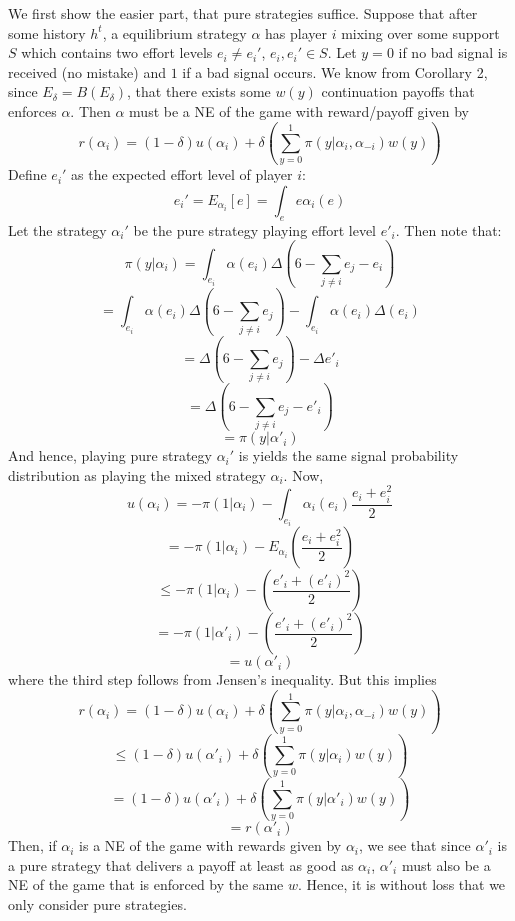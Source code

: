 \documentclass[10pt,letter]{article}
\begin{document}
We first show the easier part, that pure strategies suffice. Suppose that after some history $h^t$, a equilibrium strategy $\alpha$ has player $i$ mixing over some support $S$ which contains two effort levels $e_i \neq e_i'$, $e_i, e_i' \in S$. Let $y = 0$ if no bad signal is received (no mistake) and $1$ if a bad signal occurs. We know from Corollary 2, since $E_\delta = B(E_\delta)$, that there exists some $w(y)$ continuation payoffs that enforces $\alpha$. Then $\alpha$ must be a NE of the game with reward/payoff given by
\[ r(\alpha_i) = (1-\delta)u(\alpha_i) + \delta \left( \sum_{y=0}^1 \pi(y | \alpha_i, \alpha_{-i}) w(y) \right) \]
Define $e_i'$ as the expected effort level of player $i$:
\[ e_i' = E_{\alpha_i}[e] = \int_e e \alpha_i(e) \]
Let the strategy $\alpha_i'$ be the pure strategy playing effort level $e'_i$. Then note that:
\[ \pi(y | \alpha_i) = \int_{e_i} \alpha(e_i) \Delta \left( 6 - \sum_{j\neq i} e_j - e_i \right) \]
\[ = \int_{e_i} \alpha(e_i) \Delta \left( 6 - \sum_{j\neq i} e_j\right) - \int_{e_i} \alpha(e_i) \Delta \left(e_i \right) \]
\[ = \Delta \left( 6 - \sum_{j\neq i} e_j\right) - \Delta e'_i \]
\[ = \Delta \left( 6 - \sum_{j\neq i} e_j - e'_i\right)\]
\[ = \pi(y | \alpha'_i) \]
And hence, playing pure strategy $\alpha_i'$ is yields the same signal probability distribution as playing the mixed strategy $\alpha_i$. Now,
\[ u(\alpha_i) = - \pi(1 | \alpha_i) - \int_{e_i}\alpha_i(e_i)\frac{e_i + e_i^2}{2} \]
\[ = - \pi(1 | \alpha_i) -E_{\alpha_i}\left( \frac{e_i + e_i^2}{2} \right) \]
\[ \le - \pi(1 | \alpha_i) - \left( \frac{e'_i + (e'_i)^2}{2} \right) \]
\[ = - \pi(1 | \alpha'_i) - \left( \frac{e'_i + (e'_i)^2}{2} \right) \]
\[ = u(\alpha'_i) \]
where the third step follows from Jensen's inequality. But this implies
\[ r(\alpha_i) = (1-\delta)u(\alpha_i) + \delta \left( \sum_{y=0}^1 \pi(y | \alpha_i, \alpha_{-i}) w(y) \right) \]
\[ \le (1-\delta)u(\alpha'_i) + \delta \left( \sum_{y=0}^1 \pi(y | \alpha_i) w(y) \right)\]
\[ = (1-\delta)u(\alpha'_i) + \delta \left( \sum_{y=0}^1 \pi(y | \alpha'_i) w(y) \right)\]
\[ = r(\alpha'_i) \]
Then, if $\alpha_i$ is a NE of the game with rewards given by $\alpha_i$, we see that since $\alpha'_i$ is a pure strategy that delivers a payoff at least as good as $\alpha_i$, $\alpha'_i$ must also be a NE of the game that is enforced by the same $w$. Hence, it is without loss that we only consider pure strategies.
\end{document}

